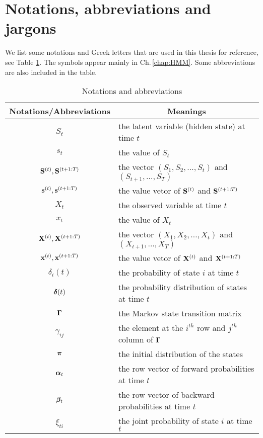 
\section{Notations, abbreviations and jargons}
\label{sec:introduction:notation}
We list some notations and Greek letters that are used in this thesis for reference,
see Table \ref{table:notations}.
The symbols appear mainly in Ch.\,\ref{chap:HMM}.
Some abbreviations are also included in the table.
        \begin{table}[!hbt]
        \center
        \caption{Notations and abbreviations}
        \label{table:notations}
        \begin{tabular}{c p{25em}}
        \hline
        \multicolumn{1}{c}{Notations/Abbreviations}	&	\multicolumn{1}{c}{Meanings}	\\	
        \hline
		$S_t$	&	the latent variable (hidden state) at time $t$	\\	
		$s_t$	&	the value of $S_t$	\\	
		${\mathbf S}^{(t)},{\mathbf S}^{(t+1:T)}$	&	the vector $(S_1,S_2,\dots,S_t)$ and $(S_{t+1},\dots,S_{T})$ 	\\	
		${\mathbf s}^{(t)},{\mathbf s}^{(t+1:T)}$	&	the value vetor of ${\mathbf S}^{(t)}$ and ${\mathbf S}^{(t+1:T)}$	\\	
		$X_t$	&	the observed variable at time $t$	\\	
		$x_t$	&	the value of $X_t$	\\	
		${\mathbf X}^{(t)},{\mathbf X}^{(t+1:T)}$	&	the vector $(X_1,X_2,\dots,X_t)$ and $(X_{t+1},\dots,X_{T})$ 	\\	
		${\mathbf x}^{(t)},{\mathbf x}^{(t+1:T)}$	&	the value vetor of ${\mathbf X}^{(t)}$ and ${\mathbf X}^{(t+1:T)}$	\\	
		$\delta_i(t)$	&	the probability of state $i$ at time $t$	\\	
		${\boldsymbol\delta}(t)$	&	the probability distribution of states at time $t$	\\	
		${\boldsymbol\Gamma}$	&	the Markov state transition matrix	\\	
		$\gamma_{ij}$	&	the element at the $i^{th}$ row and $j^{th}$ column of ${\boldsymbol\Gamma}$	\\	
		${\boldsymbol\pi}$	&	the initial distribution of the states	\\	
		${\boldsymbol\alpha}_t$	&	the row vector of forward probabilities at time $t$	\\	
		${\boldsymbol\beta}_t$	&	the row vector of backward probabilities at time $t$	\\	
		$\xi_{ti}$	&	the joint probability of state $i$ at time $t$	\\	

\end{tabular}
\end{table}
